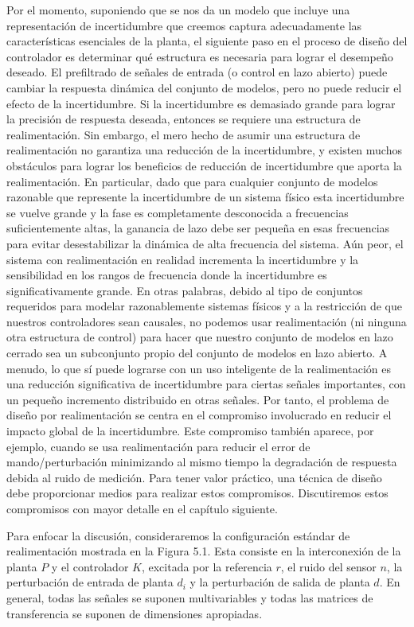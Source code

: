 Por el momento, suponiendo que se nos da un modelo que incluye una representación de incertidumbre que creemos captura adecuadamente las características esenciales de la planta, el siguiente paso en el proceso de diseño del controlador es determinar qué estructura es necesaria para lograr el desempeño deseado. El prefiltrado de señales de entrada (o control en lazo abierto) puede cambiar la respuesta dinámica del conjunto de modelos, pero no puede reducir el efecto de la incertidumbre. Si la incertidumbre es demasiado grande para lograr la precisión de respuesta deseada, entonces se requiere una estructura de realimentación. Sin embargo, el mero hecho de asumir una estructura de realimentación no garantiza una reducción de la incertidumbre, y existen muchos obstáculos para lograr los beneficios de reducción de incertidumbre que aporta la realimentación. En particular, dado que para cualquier conjunto de modelos razonable que represente la incertidumbre de un sistema físico esta incertidumbre se vuelve grande y la fase es completamente desconocida a frecuencias suficientemente altas, la ganancia de lazo debe ser pequeña en esas frecuencias para evitar desestabilizar la dinámica de alta frecuencia del sistema. Aún peor, el sistema con realimentación en realidad incrementa la incertidumbre y la sensibilidad en los rangos de frecuencia donde la incertidumbre es significativamente grande. En otras palabras, debido al tipo de conjuntos requeridos para modelar razonablemente sistemas físicos y a la restricción de que nuestros controladores sean causales, no podemos usar realimentación (ni ninguna otra estructura de control) para hacer que nuestro conjunto de modelos en lazo cerrado sea un subconjunto propio del conjunto de modelos en lazo abierto. A menudo, lo que sí puede lograrse con un uso inteligente de la realimentación es una reducción significativa de incertidumbre para ciertas señales importantes, con un pequeño incremento distribuido en otras señales. Por tanto, el problema de diseño por realimentación se centra en el compromiso involucrado en reducir el impacto global de la incertidumbre. Este compromiso también aparece, por ejemplo, cuando se usa realimentación para reducir el error de mando/perturbación minimizando al mismo tiempo la degradación de respuesta debida al ruido de medición. Para tener valor práctico, una técnica de diseño debe proporcionar medios para realizar estos compromisos. Discutiremos estos compromisos con mayor detalle en el capítulo siguiente.

Para enfocar la discusión, consideraremos la configuración estándar de realimentación mostrada en la Figura 5.1. Esta consiste en la interconexión de la planta $P$ y el controlador $K$, excitada por la referencia $r$, el ruido del sensor $n$, la perturbación de entrada de planta $d_{i}$ y la perturbación de salida de planta $d$. En general, todas las señales se suponen multivariables y todas las matrices de transferencia se suponen de dimensiones apropiadas.


